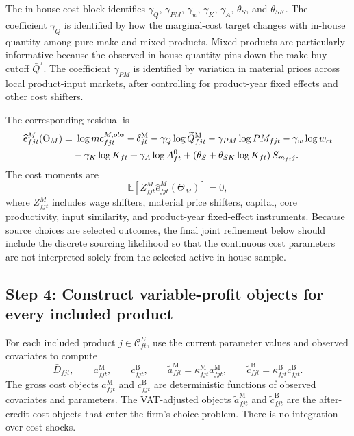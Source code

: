 \documentclass[11pt,a4paper]{article}
\newcommand{\E}{\mathbb{E}}
\newcommand{\mc}{\mathcal}
\newcommand{\M}{\mathrm{M}}
\newcommand{\B}{\mathrm{B}}
\begin{document}
The in-house cost block identifies $\gamma_Q$, $\gamma_{PM}$, $\gamma_w$, $\gamma_K$, $\gamma_A$, $\theta_S$, and $\theta_{SK}$. The coefficient $\gamma_Q$ is identified by how the marginal-cost target changes with in-house quantity among pure-make and mixed products. Mixed products are particularly informative because the observed in-house quantity pins down the make-buy cutoff $\bar Q^{\tau}$. The coefficient $\gamma_{PM}$ is identified by variation in material prices across local product-input markets, after controlling for product-year fixed effects and other cost shifters.

The corresponding residual is
\begin{align}
    \widehat e^{M}_{fjt}(\Theta_M)
    =&\ \log mc^{M,obs}_{fjt}
    -\delta^{\M}_{jt}
    -\gamma_Q\log \widetilde Q^{\M}_{fjt}
    -\gamma_{PM}\log PM_{fjt}
    -\gamma_w\log w_{ct} \notag\\
    &-\gamma_K\log K_{ft}
    +\gamma_A\log A^0_{ft}
    +\left(\theta_S+\theta_{SK}\log K_{ft}\right)S_{m_{ft}j}.
    \label{eq:make_residual}
\end{align}
The cost moments are
\begin{equation}
    \E\left[Z^M_{fjt}\widehat e^{M}_{fjt}(\Theta_M)\right]=0,
    \label{eq:make_moments}
\end{equation}
where $Z^M_{fjt}$ includes wage shifters, material price shifters, capital, core productivity, input similarity, and product-year fixed-effect instruments. Because source choices are selected outcomes, the final joint refinement below should include the discrete sourcing likelihood so that the continuous cost parameters are not interpreted solely from the selected active-in-house sample.

\subsection{Step 4: Construct variable-profit objects for every included product}

For each included product $j\in\mc{C}^{E}_{ft}$, use the current parameter values and observed covariates to compute
\begin{equation}
    \bar D_{fjt},
    \qquad
    a^{\M}_{fjt},
    \qquad
    c^{\B}_{fjt},
    \qquad
    \widetilde a^{\M}_{fjt}=\kappa^{\M}_{fjt}a^{\M}_{fjt},
    \qquad
    \widetilde c^{\B}_{fjt}=\kappa^{\B}_{fjt}c^{\B}_{fjt}.
\end{equation}
The gross cost objects $a^{\M}_{fjt}$ and $c^{\B}_{fjt}$ are deterministic functions of observed covariates and parameters. The VAT-adjusted objects $\widetilde a^{\M}_{fjt}$ and $\widetilde c^{\B}_{fjt}$ are the after-credit cost objects that enter the firm's choice problem. There is no integration over cost shocks.
\end{document}
